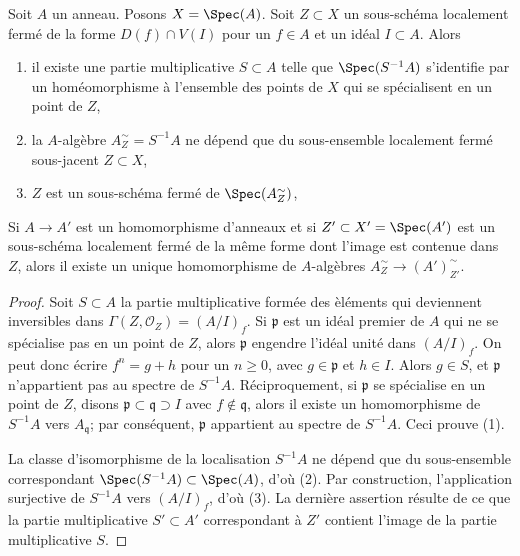 \begin{lemma}
\label{lemma-localization}
Soit $A$ un anneau. Posons $X = \Spec(A)$. Soit $Z \subset X$ un sous-sch\'ema localement
ferm\'e de la forme $D(f) \cap V(I)$ pour un $f \in A$ et un
id\'eal $I \subset A$. Alors
\begin{enumerate}
\item il existe une partie multiplicative $S \subset A$ telle que
$\Spec(S^{-1}A)$ s'identifie par un hom\'eomorphisme \`a l'ensemble des points de $X$
qui se sp\'ecialisent en un point de $Z$,
\item la $A$-alg\`ebre $A_Z^\sim = S^{-1}A$ ne d\'epend que du
sous-ensemble localement ferm\'e sous-jacent $Z \subset X$,
\item $Z$ est un sous-sch\'ema ferm\'e de $\Spec(A_Z^\sim)$,
\end{enumerate}
Si $A \to A'$ est un homomorphisme d'anneaux et si $Z' \subset X' = \Spec(A')$ est un
sous-sch\'ema localement ferm\'e de la m\^eme forme dont l'image est contenue dans $Z$,
alors il existe un unique homomorphisme de $A$-alg\`ebres
$A_Z^\sim \to (A')_{Z'}^\sim$.
\end{lemma}

\begin{proof}
Soit $S \subset A$ la partie multiplicative form\'ee des \`el\'ements qui deviennent
inversibles dans $\Gamma(Z, \mathcal{O}_Z) = (A/I)_f$.
Si $\mathfrak p$ est un id\'eal premier de $A$ qui ne se sp\'ecialise pas en un point de $Z$,
alors $\mathfrak p$ engendre l'id\'eal unit\'e dans $(A/I)_f$. On peut donc
\'ecrire $f^n =  g + h$ pour un $n \geq 0$, avec $g \in \mathfrak p$ et
$h \in I$. Alors $g \in S$, et $\mathfrak p$ n'appartient pas
au spectre de $S^{-1}A$. R\'eciproquement, si $\mathfrak p$ se sp\'ecialise
en un point de $Z$, disons $\mathfrak p \subset \mathfrak q \supset I$ avec
$f \not \in \mathfrak q$, alors il existe un homomorphisme de $S^{-1}A$ vers
$A_\mathfrak q$; par cons\'equent, $\mathfrak p$ appartient au spectre de $S^{-1}A$.
Ceci prouve (1).

\medskip\noindent
La classe d'isomorphisme de la localisation $S^{-1}A$ ne d\'epend que
du sous-ensemble correspondant $\Spec(S^{-1}A) \subset \Spec(A)$, d'o\`u
(2). Par construction, l'application surjective de $S^{-1}A$ vers
$(A/I)_f$, d'o\`u (3). La derni\`ere assertion r\'esulte de ce que la partie multiplicative
$S' \subset A'$ correspondant \`a $Z'$ contient l'image de la
partie multiplicative $S$.
\end{proof}

